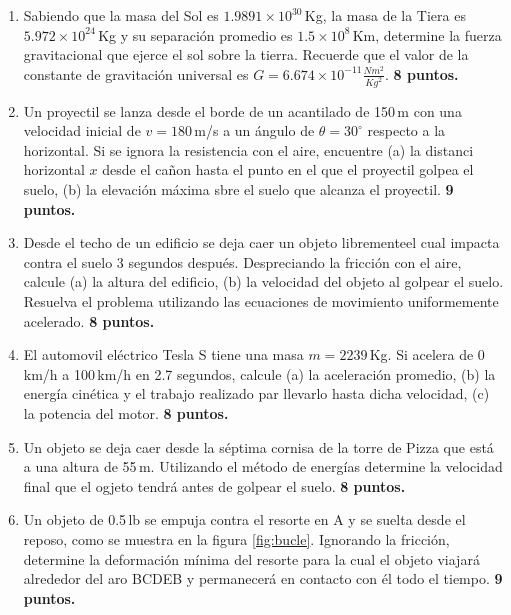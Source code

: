 \documentclass[]{article}
\begin{document}
\begin{enumerate}

\item Sabiendo que la masa del Sol es $1.9891\times 10^{30}$\,Kg, la masa de la
Tiera es $5.972\times 10^{24}$\,Kg y su separaci\'on promedio es $1.5 \times
10^{8}$\,Km, determine la fuerza gravitacional que ejerce el sol sobre la
tierra. Recuerde que el valor de la constante de gravitaci\'on universal es
$G=6.674\times 10^{-11} \frac{Nm^{2}}{Kg^{2}}$.
\hfill \textbf{8 puntos.}


\item Un proyectil se lanza desde el borde de un acantilado de 150\,m con una
velocidad inicial de $v=180$\,m/s a un \'angulo de $\theta=30^{\circ}$ respecto
a la horizontal. Si se ignora la resistencia con el aire, encuentre (a) la
distanci horizontal $x$ desde el ca\~non hasta el punto en el que el proyectil
golpea el suelo, (b) la elevaci\'on m\'axima sbre el suelo que alcanza el
proyectil.
\hfill \textbf{9 puntos.}

\item Desde el techo de un edificio se deja caer un objeto librementeel cual
impacta contra el suelo 3 segundos despu\'es. Despreciando la fricci\'on con el
aire, calcule (a) la altura del edificio, (b) la velocidad del objeto al golpear
el suelo. Resuelva el problema utilizando las ecuaciones de movimiento
uniformemente acelerado.
\hfill \textbf{8 puntos.}

\item El automovil el\'ectrico Tesla S tiene una masa $m=2239$\,Kg. Si acelera
de 0\,km/h a 100\,km/h en 2.7 segundos, calcule (a) la aceleraci\'on promedio,
(b) la energ\'ia cin\'etica y el trabajo realizado par llevarlo hasta dicha
velocidad, (c) la potencia del motor.
\hfill \textbf{8 puntos.}

\newpage
\item Un objeto se deja caer desde la s\'eptima cornisa de la torre de Pizza que
est\'a a una altura de 55\,m. Utilizando el m\'etodo de energ\'ias determine la
velocidad final que el ogjeto tendr\'a antes de golpear el suelo.
\hfill \textbf{8 puntos.}

\item Un objeto de 0.5\,lb se empuja contra el resorte en A y se suelta desde el
reposo, como se muestra en la figura \ref{fig:bucle}. Ignorando la fricción,
determine la deformaci\'on m\'inima del resorte para la cual el objeto viajar\'a
alrededor del aro BCDEB y permanecer\'a en contacto con \'el todo el tiempo.
\hfill \textbf{9 puntos.}


\end{enumerate}
\end{document}
